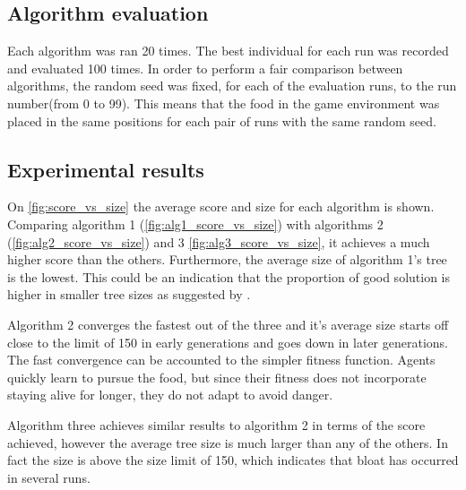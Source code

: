 \documentclass[12pt,a4paper]{article}
\begin{document}
		\subsection{Algorithm evaluation} \label{subsec:evaluation}
		Each algorithm was ran 20 times. The best individual for each run was recorded and evaluated 100 times. In order to perform a fair comparison between algorithms, the random seed was fixed, for each of the evaluation runs, to the run number(from 0 to 99). This means that the food in the game environment was placed in the same positions for each pair of runs with the same random seed. 
		
		\subsection{Experimental results} \label{subsec:results}
		On \autoref{fig:score_vs_size} the average score and size for each algorithm is shown. Comparing algorithm 1 (\autoref{fig:alg1_score_vs_size}) with algorithms 2 (\autoref{fig:alg2_score_vs_size}) and 3 \autoref{fig:alg3_score_vs_size}, it achieves a much higher score than the others. Furthermore, the average size of algorithm 1's tree is the lowest. This could be an indication that the proportion of good solution is higher in smaller tree sizes as suggested by \cite{langdon_why_1998}.
		
		Algorithm 2 converges the fastest out of the three and it's average size starts off close to the limit of 150 in early generations and goes down in later generations. The fast convergence can be accounted to the simpler fitness function. Agents quickly learn to pursue the food, but since their fitness does not incorporate staying alive for longer, they do not adapt to avoid danger.
		
		Algorithm three achieves similar results to algorithm 2 in terms of the score achieved, however the average tree size is much larger than any of the others. In fact the size is above the size limit of 150, which indicates that bloat has occurred in several runs.
		
\end{document}
